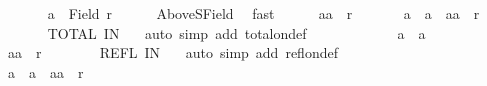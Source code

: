 \begin{isabellebody}
\ \ \ \ \isamarkupfalse%
\ {\isacharasterisk}{\kern0pt}{\isacharasterisk}{\kern0pt}{\isacharcolon}{\kern0pt}\ {\isachardoublequoteopen}a{\isacharprime}{\kern0pt}\ {\isasymin}\ Field\ r{\isachardoublequoteclose}\isanewline
\ \ \ \ \isamarkupfalse%
\ AboveS{\isacharunderscore}{\kern0pt}Field\ \isamarkupfalse%
\ fast\isanewline
\ \ \ \ \isacommand{{\isacharbraceleft}{\kern0pt}}\isamarkupfalse%
\isamarkupfalse%
\ {\isachardoublequoteopen}{\isacharparenleft}{\kern0pt}a{\isacharcomma}{\kern0pt}a{\isacharprime}{\kern0pt}{\isacharparenright}{\kern0pt}\ {\isasymnotin}\ r{\isachardoublequoteclose}\isanewline
\ \ \ \ \ \isamarkupfalse%
\ {\isachardoublequoteopen}a{\isacharprime}{\kern0pt}\ {\isacharequal}{\kern0pt}\ a\ {\isasymor}\ {\isacharparenleft}{\kern0pt}a{\isacharprime}{\kern0pt}{\isacharcomma}{\kern0pt}a{\isacharparenright}{\kern0pt}\ {\isasymin}\ r{\isachardoublequoteclose}\isanewline
\ \ \ \ \ \isamarkupfalse%
\ TOTAL\ IN\ {\isacharasterisk}{\kern0pt}{\isacharasterisk}{\kern0pt}\ \isamarkupfalse%
\ {\isacharparenleft}{\kern0pt}auto\ simp\ add{\isacharcolon}{\kern0pt}\ total{\isacharunderscore}{\kern0pt}on{\isacharunderscore}{\kern0pt}def{\isacharparenright}{\kern0pt}\isanewline
\ \ \ \ \ \isamarkupfalse%
\isanewline
\ \ \ \ \ \isacommand{{\isacharbraceleft}{\kern0pt}}\isamarkupfalse%
\isamarkupfalse%
\ {\isachardoublequoteopen}a{\isacharprime}{\kern0pt}\ {\isacharequal}{\kern0pt}\ a{\isachardoublequoteclose}\isanewline
\ \ \ \ \ \ \isamarkupfalse%
\ {\isachardoublequoteopen}{\isacharparenleft}{\kern0pt}a{\isacharcomma}{\kern0pt}a{\isacharprime}{\kern0pt}{\isacharparenright}{\kern0pt}\ {\isasymin}\ r{\isachardoublequoteclose}\isanewline
\ \ \ \ \ \ \isamarkupfalse%
\ REFL\ IN\ {\isacharasterisk}{\kern0pt}{\isacharasterisk}{\kern0pt}\ \isamarkupfalse%
\ {\isacharparenleft}{\kern0pt}auto\ simp\ add{\isacharcolon}{\kern0pt}\ refl{\isacharunderscore}{\kern0pt}on{\isacharunderscore}{\kern0pt}def{\isacharparenright}{\kern0pt}\isanewline
\ \ \ \ \ \isacommand{{\isacharbraceright}{\kern0pt}}\isamarkupfalse%
\isanewline
\ \ \ \ \ \isamarkupfalse%
\isanewline
\ \ \ \ \ \isacommand{{\isacharbraceleft}{\kern0pt}}\isamarkupfalse%
\isamarkupfalse%
\ {\isachardoublequoteopen}a{\isacharprime}{\kern0pt}\ {\isasymnoteq}\ a\ {\isasymand}\ {\isacharparenleft}{\kern0pt}a{\isacharprime}{\kern0pt}{\isacharcomma}{\kern0pt}a{\isacharparenright}{\kern0pt}\ {\isasymin}\ r{\isachardoublequoteclose}\isanewline

\end{isabellebody}
